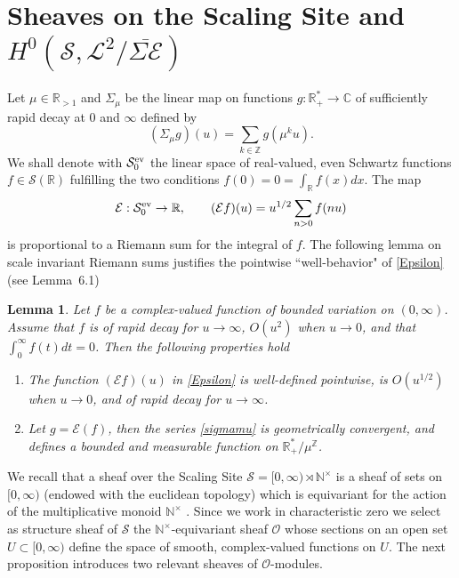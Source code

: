 \documentclass{pspum-l}
\newtheorem{lemma}[theorem]{Lemma}
\theoremstyle{definition}
\theoremstyle{remark}
\numberwithin{equation}{section}
\def\C{{\mathbb C}}
\def\R{{\mathbb R}}
\def\Z{{\mathbb Z}}
\def\cE{{\mathcal E}}
\def\cL{{\mathcal L}}
\def\cO{{\mathcal O}}
\def\cS{{\mathcal S}}
\def\sr0{{\cS^{\rm ev}_0}}
\def\rnt{{[0,\infty)\rtimes{\N^{\times}}}}
\def\nt{\N^{\times}}
\def\N{{\mathbb N}}
\def\scal2{{\mathscr S}}
\begin{document}
 
 \section{Sheaves on the Scaling Site and  $H^0(\scal2,\cL^2/\overline{\Sigma\cE})$}\label{secttech}
 
 
Let $\mu\in\R_{>1}$ and  $\Sigma_\mu$    be  the linear map on functions $g: \R^*_+ \to \C$   of sufficiently rapid decay at $0$ and $\infty$  defined by 
\begin{equation}\label{sigmamu}
(\Sigma_\mu g)(u)=\sum_{k\in\Z}g(\mu^ku).
\end{equation}
We shall  denote with $\sr0$ the linear space of real-valued, even Schwartz functions $f \in \cS(\R)$ fulfilling the two conditions
$f(0) = 0 = \int_\R f(x)dx$. The map
\begin{equation}\label{Epsilon}
\cE: \sr0 \to \R,\qquad (\cE f)(u)= u^{1/2}\sum_{n>0}f(nu)
\end{equation}
is proportional to a Riemann sum for the integral of $f$.
 The following  lemma on scale invariant Riemann sums  justifies the pointwise ``well-behavior" of \eqref{Epsilon} (see \cite{ccspectral} Lemma~6.1)
 
 \begin{lemma}\label{fouriertruncated1}\; Let $f$ be a complex-valued function of bounded variation on $(0,\infty)$. Assume that $f$ is of rapid decay for $u\to \infty$,  $O(u^2)$ when $ u\to 0$, and  that $\int_0^{\infty}f(t)dt=0$.  Then the following properties hold 
 \begin{enumerate}
\item[(i)]  The function $(\cE f)(u)$ in \eqref{Epsilon} is well-defined pointwise, is 
$O(u^{1/2})$ when $u\to 0$, and of rapid decay for $u\to\infty$.
\item[(ii)] Let  $g=\cE(f)$, then the series \eqref{sigmamu}  is geometrically convergent, and defines a bounded and measurable  function on  $\R_+^*/\mu^{\Z}$.
\end{enumerate}
\end{lemma}

 We recall that a sheaf over  the Scaling Site $\scal2=\rnt$ is a sheaf of sets on $[0,\infty)$ (endowed with the euclidean topology)  which is equivariant for the action of the multiplicative monoid $\nt$ \cite{CCscal1}.  Since we work in characteristic zero we select as structure sheaf  of $\scal2$ the $\nt$-equivariant sheaf $\cO$ whose sections on an open set $U\subset [0,\infty)$ define the space of smooth, complex-valued  functions on $U$.
 The next proposition introduces two relevant sheaves of $\cO$-modules.
 
\end{document}
